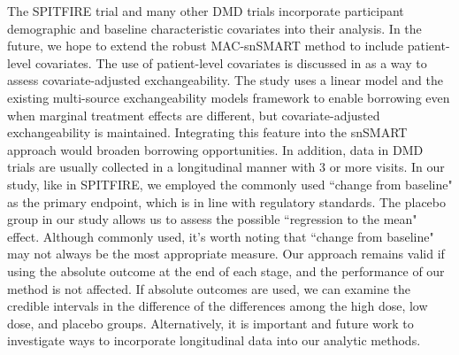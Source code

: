 The SPITFIRE trial and many other \ac{DMD} trials incorporate participant demographic and baseline characteristic covariates into their analysis. In the future, we hope to extend the robust MAC-snSMART method to include patient-level covariates. The use of patient-level covariates is discussed in \cite{kotalik2021dynamic} as a way to assess covariate-adjusted exchangeability. The study uses a linear model and the existing multi-source exchangeability models framework to enable borrowing even when marginal treatment effects are different, but covariate-adjusted exchangeability is maintained. Integrating this feature into the \ac{snSMART} approach would broaden borrowing opportunities. In addition, data in \ac{DMD} trials are usually collected in a longitudinal manner with 3 or more visits. In our study, like in SPITFIRE, we employed the commonly used ``change from baseline" as the primary endpoint, which is in line with regulatory standards. The placebo group in our study allows us to assess the possible ``regression to the mean" effect. Although commonly used, it's worth noting that ``change from baseline" may not always be the most appropriate measure. Our approach remains valid if using the absolute outcome at the end of each stage, and the performance of our method is not affected. If absolute outcomes are used, we can examine the credible intervals in the difference of the differences among the high dose, low dose, and placebo groups. Alternatively, it is important and future work to investigate ways to incorporate longitudinal data into our analytic methods.